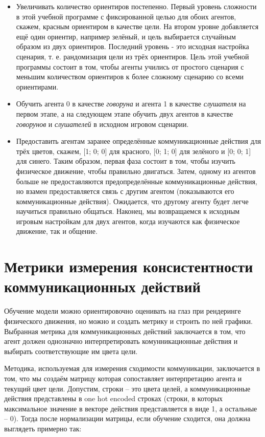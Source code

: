 \begin{itemize}
    \item Увеличивать количество ориентиров постепенно. Первый уровень сложности в этой учебной программе с фиксированной целью для обоих агентов, скажем, красным ориентиром в качестве цели. На втором уровне добавляется ещё один ориентир, например зелёный, и цель выбирается случайным образом из двух ориентиров. Последний уровень - это исходная настройка сценария, т. е. рандомизация цели из трёх ориентиров. Цель этой учебной программы состоит в том, чтобы агенты учились от простого сценария с меньшим количеством ориентиров к более сложному сценарию со всеми ориентирами.
    \item Обучить агента 0 в качестве \textit{говоруна} и агента 1 в качестве \textit{слушателя} на первом этапе, а на следующем этапе обучить двух агентов в качестве \textit{говорунов} и \textit{слушателей} в исходном игровом сценарии.
    \item Предоставить агентам заранее определённые коммуникационные действия для трёх цветов, скажем, [1; 0; 0] для красного, [0; 1; 0] для зелёного и [0; 0; 1] для синего. Таким образом, первая фаза состоит в том, чтобы изучить физическое движение, чтобы правильно двигаться. Затем, одному из агентов больше не предоставляются предопределённые коммуникационные действия, но взамен предоставляется связь с другим агентом (показываются его коммуникационные действия). Ожидается, что другому агенту будет легче научиться правильно общаться. Наконец, мы возвращаемся к исходным игровым настройкам для двух агентов, когда изучаются как физическое движение, так и общение.
\end{itemize}

\section{Метрики измерения консистентности коммуникационных действий}

Обучение модели можно ориентировочно оценивать на глаз при рендеринге физического движения, но можно и создать метрику и строить по ней графики. Выбранная метрика для коммуникационных действий заключается в том, что агент должен однозначно интерпретировать комунникационные действия и выбирать соответствующие им цвета цели.

Методика, используемая для измерения сходимости коммуникации, заключается в том, что мы создаём матрицу которая сопоставляет интерпретацию агента и текущий цвет цели. Допустим, строки – это цвета целей, а коммуникационные действия представлены в one hot encoded строках (строки, в которых максимальное значение в векторе действия представляется в виде 1, а остальные – 0). Тогда после нормализации матрицы, если обучение сходится, она должна выглядеть примерно так:

